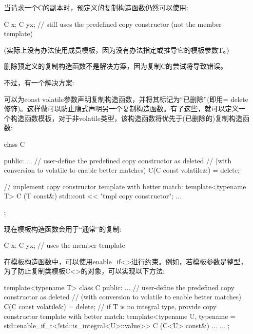 当请求一个C的副本时，预定义的复制构造函数仍然可以使用:

\begin{cpp}
C x;
C y{x}; // still uses the predefined copy constructor (not the member template)
\end{cpp}

(实际上没有办法使用成员模板，因为没有办法指定或推导它的模板参数T。)

删除预定义的复制构造函数不是解决方案，因为复制C的尝试将导致错误。

不过，有一个解决方案:

可以为const volatile参数声明复制构造函数，并将其标记为“已删除”(即用= delete修饰)。这样做可以防止隐式声明另一个复制构造函数。有了这些，就可以定义一个构造函数模板，对于非volatile类型，该构造函数将优先于(已删除的)复制构造函数:

\begin{cpp}
class C
{
public:
	...
	// user-define the predefined copy constructor as deleted
	// (with conversion to volatile to enable better matches)
	C(C const volatile&) = delete;
	
	// implement copy constructor template with better match:
	template<typename T>
	C (T const&) {
		std::cout << "tmpl copy constructor\n";
	}
...
};
\end{cpp}

现在模板构造函数会用于“通常”的复制:

\begin{cpp}
C x;
C y{x}; // uses the member template
\end{cpp}

在模板构造函数中，可以使用enable\_if<>进行约束。例如，若模板参数是整型，为了防止复制类模板C<>的对象，可以实现以下方法:

\begin{cpp}
template<typename T>
class C
{
public:
	...
	// user-define the predefined copy constructor as deleted
	// (with conversion to volatile to enable better matches)
	C(C const volatile&) = delete;
	// if T is no integral type, provide copy constructor template with better match:
	template<typename U,
	typename = std::enable_if_t<!std::is_integral<U>::value>>
	C (C<U> const&) {
		...
	}
	...
};
\end{cpp}












